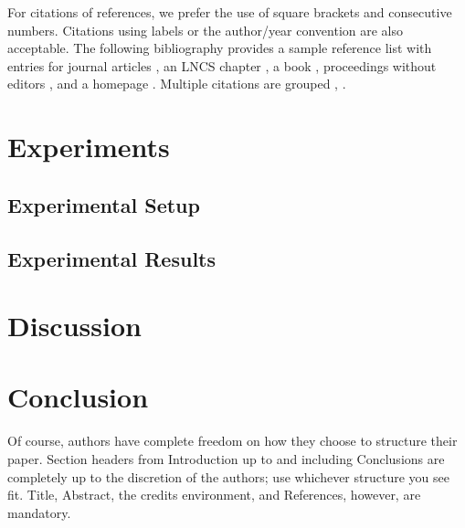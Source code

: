\documentclass[runningheads]{llncs}
\begin{document}
For citations of references, we prefer the use of square brackets and
consecutive numbers. Citations using labels or the author/year
convention are also acceptable. The following bibliography provides a
sample reference list with entries for journal articles
\citep{ref_article1}, an LNCS chapter \citep{ref_lncs1}, a book
\citep{ref_book1}, proceedings without editors \citep{ref_proc1}, and a
homepage \citep{ref_url1}. Multiple citations are grouped
\citep{ref_article1, ref_lncs1, ref_book1},
\citep{ref_article1, ref_book1, ref_proc1, ref_url1}.

\section{Experiments}\label{experiments}

\subsection{Experimental Setup}\label{experimental-setup}

\subsection{Experimental Results}\label{experimental-results}

\section{Discussion}\label{discussion}

\section{Conclusion}\label{conclusion}

Of course, authors have complete freedom on how they choose to structure
their paper. Section headers from Introduction up to and including
Conclusions are completely up to the discretion of the authors; use
whichever structure you see fit. Title, Abstract, the credits
environment, and References, however, are mandatory.
\end{document}
